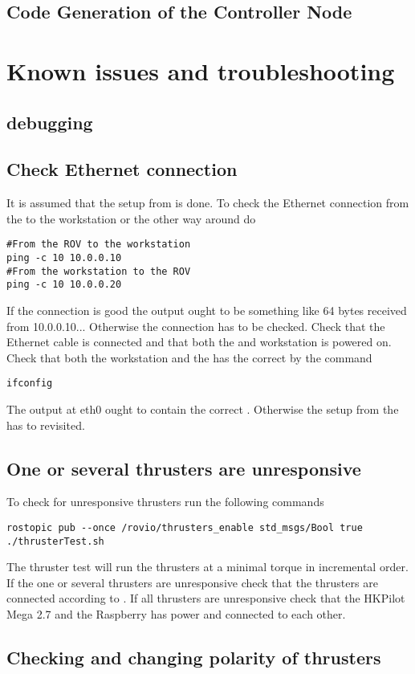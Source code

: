 \subsection{Code Generation of the Controller Node}


\section{Known issues and troubleshooting}

\subsection{\abbrROS debugging}

\subsection{Check Ethernet connection}
It is assumed that the setup from  is done. To check the Ethernet connection from the \abbrROV to the workstation or the other way around do
\begin{lstlisting}
#From the ROV to the workstation
ping -c 10 10.0.0.10 
#From the workstation to the ROV
ping -c 10 10.0.0.20
\end{lstlisting}
If the connection is good the output ought to be something like 64 bytes received from 10.0.0.10... Otherwise the connection has to be checked. Check that the Ethernet cable is connected and that both the \abbrROV and workstation is powered on. Check that both the workstation and the \abbrROV has the correct \abbrIP by the command
\begin{lstlisting}
ifconfig
\end{lstlisting}
The output at eth0 ought to contain the correct \abbrIP. Otherwise the setup from the  has to revisited.

\subsection{One or several thrusters are unresponsive}
To check for unresponsive thrusters run the following commands 
\begin{lstlisting}
rostopic pub --once /rovio/thrusters_enable std_msgs/Bool true
./thrusterTest.sh
\end{lstlisting}
The thruster test will run the thrusters at a minimal torque in incremental order. If the one or several thrusters are unresponsive check that the thrusters are connected according to . If all thrusters are unresponsive check that the HKPilot Mega 2.7 and the Raspberry has power and connected to each other. 

\subsection{Checking and changing polarity of thrusters}
